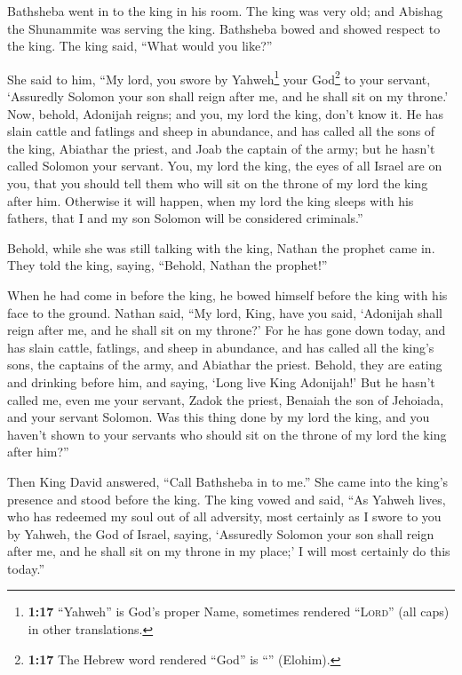  Bathsheba went in to the king in his room. The king was
very old; and Abishag the Shunammite was serving the king.
 Bathsheba bowed and showed respect to the king. The king
said, ``What would you like?''

 She said to him, ``My lord, you swore by
Yahweh\footnote{\textbf{1:17} ``Yahweh'' is God's proper Name, sometimes
  rendered ``\textsc{Lord}'' (all caps) in other translations.} your
God\footnote{\textbf{1:17} The Hebrew word rendered ``God'' is
  ``'' (Elohim).} to your servant, `Assuredly Solomon your
son shall reign after me, and he shall sit on my throne.'
 Now, behold, Adonijah reigns; and you, my lord the king,
don't know it.  He has slain cattle and fatlings and
sheep in abundance, and has called all the sons of the king, Abiathar
the priest, and Joab the captain of the army; but he hasn't called
Solomon your servant.  You, my lord the king, the eyes of
all Israel are on you, that you should tell them who will sit on the
throne of my lord the king after him.  Otherwise it will
happen, when my lord the king sleeps with his fathers, that I and my son
Solomon will be considered criminals.''

 Behold, while she was still talking with the king,
Nathan the prophet came in.  They told the king, saying,
``Behold, Nathan the prophet!''

When he had come in before the king, he bowed himself before the king
with his face to the ground.  Nathan said, ``My lord,
King, have you said, `Adonijah shall reign after me, and he shall sit on
my throne?'  For he has gone down today, and has slain
cattle, fatlings, and sheep in abundance, and has called all the king's
sons, the captains of the army, and Abiathar the priest. Behold, they
are eating and drinking before him, and saying, `Long live King
Adonijah!'  But he hasn't called me, even me your
servant, Zadok the priest, Benaiah the son of Jehoiada, and your servant
Solomon.  Was this thing done by my lord the king, and
you haven't shown to your servants who should sit on the throne of my
lord the king after him?''

 Then King David answered, ``Call Bathsheba in to me.''
She came into the king's presence and stood before the king.
 The king vowed and said, ``As Yahweh lives, who has
redeemed my soul out of all adversity,  most certainly as
I swore to you by Yahweh, the God of Israel, saying, `Assuredly Solomon
your son shall reign after me, and he shall sit on my throne in my
place;' I will most certainly do this today.''


